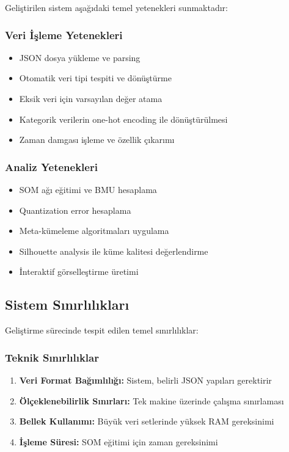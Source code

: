 Geliştirilen sistem aşağıdaki temel yetenekleri sunmaktadır:

\subsubsection{Veri İşleme Yetenekleri}

\begin{itemize}
    \item JSON dosya yükleme ve parsing
    \item Otomatik veri tipi tespiti ve dönüştürme
    \item Eksik veri için varsayılan değer atama
    \item Kategorik verilerin one-hot encoding ile dönüştürülmesi
    \item Zaman damgası işleme ve özellik çıkarımı
\end{itemize}

\newpage

\subsubsection{Analiz Yetenekleri}

\begin{itemize}
    \item SOM ağı eğitimi ve BMU hesaplama
    \item Quantization error hesaplama
    \item Meta-kümeleme algoritmaları uygulama
    \item Silhouette analysis ile küme kalitesi değerlendirme
    \item İnteraktif görselleştirme üretimi
\end{itemize}


\subsection{Sistem Sınırlılıkları}

Geliştirme sürecinde tespit edilen temel sınırlılıklar:

\subsubsection{Teknik Sınırlılıklar}

\begin{enumerate}
    \item \textbf{Veri Format Bağımlılığı:} Sistem, belirli JSON yapıları gerektirir
    
    \item \textbf{Ölçeklenebilirlik Sınırları:} Tek makine üzerinde çalışma sınırlaması
    
    \item \textbf{Bellek Kullanımı:} Büyük veri setlerinde yüksek RAM gereksinimi
    
    \item \textbf{İşleme Süresi:} SOM eğitimi için zaman gereksinimi
\end{enumerate}

